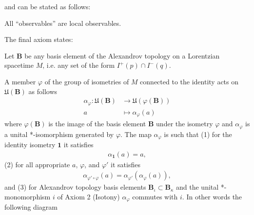 and can be stated as follows:

\begin{definition}
    \label{def:local-completeness-in-curved-spacetime}
    \leanok
    All ``observables'' are local observables.
\end{definition}

The final axiom states:

\begin{definition}
    \label{def:isometric-covariance-in-curved-spacetime}
    \leanok
    Let $\mathbf{B}$ be any basis element of the Alexandrov topology on a Lorentzian spacetime $M$, i.e. any set of the form $I^+(p) \cap I^-(q)$.
    
    A member $\varphi$ of the group of isometries of $M$ connected to the identity acts on $\mathfrak{U}(\mathbf{B})$ as follows
    \begin{align}
        \alpha_\varphi : \mathfrak{U}(\mathbf{B}) &\longrightarrow \mathfrak{U}(\varphi(\mathbf{B})) \\
                                   a              &\longmapsto     \alpha_\varphi(a)
    \end{align}
    where $\varphi(\mathbf{B})$ is the image of the basis element $\mathbf{B}$ under the isometry $\varphi$ and $\alpha_\varphi$ is a unital *-isomorphism generated by $\varphi$. The map $\alpha_\varphi$ is such that (1) for the identity isometry $\mathbf{1}$ it satisfies
    \begin{align}
        \alpha_{\mathbf{1}}(a) = a,
    \end{align}
    (2) for all appropriate $a$, $\varphi$, and $\varphi'$ it satisfies
    \begin{align}
        \alpha_{\varphi' \circ \varphi}(a) = \alpha_{\varphi'}(\alpha_{\varphi}(a)),
    \end{align}
    and (3) for Alexandrov topology basis elements $\mathbf{B}_\iota \subset \mathbf{B}_\kappa$ and the unital *-monomorphism $i$ of Axiom 2 (Isotony) $\alpha_\varphi$ commutes with $i$. In other words the following diagram


\end{definition}

